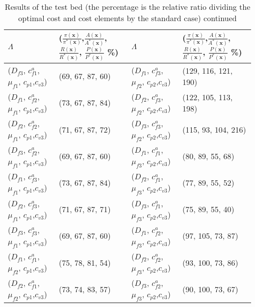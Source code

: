 \documentclass[preprint,12pt]{elsarticle}
\begin{document}
\begin{appendices}
\begin{table}[htbp]
\footnotesize
  \centering
  \caption {Results of the test bed (the percentage is the relative ratio dividing the optimal cost and cost elements by the standard case) continued}
    \begin{tabular}{llll}
    \toprule
    $\Lambda$ & ($\frac{\pi({\boldsymbol{x}})}{\pi^{*}({\boldsymbol{x}})}$,$\frac{A(\boldsymbol{x})}{A^{*}(\boldsymbol{x})}$,
    $\frac{R(\boldsymbol{x})}{R^{*}(\boldsymbol{x})}$, $\frac{P(\boldsymbol{x})}{P^{*}(\boldsymbol{x})}$ \%)    & $\Lambda$ & ($\frac{\pi({\boldsymbol{x}})}{\pi^{*}({\boldsymbol{x}})}$,$\frac{A(\boldsymbol{x})}{A^{*}(\boldsymbol{x})}$,
    $\frac{R(\boldsymbol{x})}{R^{*}(\boldsymbol{x})}$, $\frac{P(\boldsymbol{x})}{P^{*}(\boldsymbol{x})}$ \%) \\
     \midrule
    ($D_{f3}$, $c^{a}_{f1}$, $\mu_{f1}$, $c_{p1}$,$c_{v3}$) & (69, 67, 87, 60) & ($D_{f1}$, $c^{a}_{f3}$, $\mu_{f2}$, $c_{p2}$,$c_{v3}$) & (129, 116, 121, 190) \\
    ($D_{f1}$, $c^{a}_{f2}$, $\mu_{f1}$, $c_{p1}$,$c_{v3}$) & (73, 67, 87, 84) & ($D_{f2}$, $c^{a}_{f3}$, $\mu_{f2}$, $c_{p2}$,$c_{v3}$) & (122, 105, 113, 198) \\
    ($D_{f2}$, $c^{a}_{f2}$, $\mu_{f1}$, $c_{p1}$,$c_{v3}$) & (71, 67, 87, 72) & ($D_{f3}$, $c^{a}_{f3}$, $\mu_{f2}$, $c_{p2}$,$c_{v3}$) & (115, 93, 104, 216) \\
    ($D_{f3}$, $c^{a}_{f2}$, $\mu_{f1}$, $c_{p1}$,$c_{v3}$) & (69, 67, 87, 60) & ($D_{f1}$, $c^{a}_{f1}$, $\mu_{f3}$, $c_{p2}$,$c_{v3}$) & (80, 89, 55, 68) \\
    ($D_{f1}$, $c^{a}_{f3}$, $\mu_{f1}$, $c_{p1}$,$c_{v3}$) & (73, 67, 87, 84) & ($D_{f2}$, $c^{a}_{f1}$, $\mu_{f3}$, $c_{p2}$,$c_{v3}$) & (77, 89, 55, 52) \\
    ($D_{f2}$, $c^{a}_{f3}$, $\mu_{f1}$, $c_{p1}$,$c_{v3}$) & (71, 67, 87, 71) & ($D_{f3}$, $c^{a}_{f1}$, $\mu_{f3}$, $c_{p2}$,$c_{v3}$) & (75, 89, 55, 40) \\
    ($D_{f3}$, $c^{a}_{f3}$, $\mu_{f1}$, $c_{p1}$,$c_{v3}$) & (69, 67, 87, 60) & ($D_{f1}$, $c^{a}_{f2}$, $\mu_{f3}$, $c_{p2}$,$c_{v3}$) & (97, 105, 73, 87) \\
    ($D_{f1}$, $c^{a}_{f1}$, $\mu_{f2}$, $c_{p1}$,$c_{v3}$) & (75, 78, 81, 54) & ($D_{f2}$, $c^{a}_{f2}$, $\mu_{f3}$, $c_{p2}$,$c_{v3}$) & (93, 100, 73, 86) \\
    ($D_{f2}$, $c^{a}_{f1}$, $\mu_{f2}$, $c_{p1}$,$c_{v3}$) & (73, 74, 83, 57) & ($D_{f3}$, $c^{a}_{f2}$, $\mu_{f3}$, $c_{p2}$,$c_{v3}$) & (90, 100, 73, 67) \\

\end{tabular}
\end{table}
\end{appendices}
\end{document}

